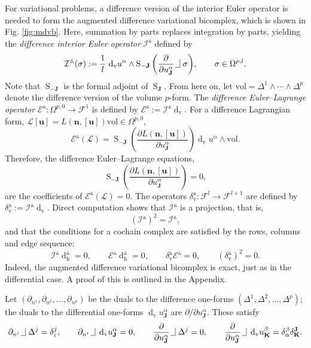 \documentclass[11pt]{article} %
\numberwithin{equation}{section}
\newcommand{\intpsym}{\,\, \setlength{\unitlength}{0.4mm}
	\begin{picture}(0, 0)(5, 5)%
	\put(0, 4){\line(1,0){5}} \put(5,4){\line(0,1){8}}
	\end{picture}\,\,}
\newcommand{\intp}{\,\,\intpsym}
\newcommand{\es}{\operatorname{S}}
\newcommand{\upd}{\operatorname{d}}
\newcommand{\uph}{\operatorname{h}}
\newcommand{\upv}{\operatorname{v}}
\newcommand{\p}{\partial}
\newcommand{\dv}{\upd_{\upv}\!}
\newcommand{\mbn}{\mathbf{n}}
\newcommand{\mbu}{\mathbf{u}}
\newcommand{\mbJ}{\mathbf{J}}
\newcommand{\mbK}{\mathbf{K}}
\newcommand{\mcE}{\mathcal{E}}
\newcommand{\mcI}{\mathcal{I}}
\newcommand{\msL}{\mathscr{L}}
\theoremstyle{plain}
\theoremstyle{definition}
\begin{document}
For variational problems, a difference version of the interior Euler operator is needed to form the augmented difference variational bicomplex, which is shown in Fig. \ref{fig:mdvb}. Here, summation by parts replaces integration by parts, yielding the \textit{difference interior Euler operator} $\mcI^{\vartriangle}$ defined by
\begin{equation} %
\mcI^{\vartriangle}(\sigma):=\frac{1}{l}\,\dv u^{\alpha}
\wedge{\es_{-\mbJ}\left(\frac{\partial}{\partial
		u^{\alpha}_{\mbJ}}\intp\sigma\right)}, \qquad
\sigma\in\Omega^{p,l}.
\end{equation}
Note that $\es_{-\mbJ}$ is the formal adjoint of $\es_{\mbJ}$. From here on, let $\text{vol}=\Delta^1\wedge\cdots\wedge\Delta^p$ denote the difference version of the volume $p$-form. The \textit{difference Euler--Lagrange operator} $\mcE^{\vartriangle}:\Omega^{p,0}\rightarrow\mathscr{F}^1$ is defined by $\mcE^{\vartriangle}:=\mcI^{\vartriangle}\dv $. For a difference Lagrangian form, $\msL[\mbu]=L(\mbn,[\mbu])\text{vol}\in\Omega^{p,0}$,
\begin{equation}
\mcE^{\vartriangle}(\msL)=\es_{-\mbJ}\left(\frac{\partial L(\mbn,[\mbu])}{\partial u^{\alpha}_{\mbJ}}\right)\dv u^\alpha\wedge \text{vol}.
\end{equation}
Therefore, the difference Euler--Lagrange equations,
\[
\es_{-\mbJ}\left(\frac{\partial L(\mbn,[\mbu])}{\partial u^{\alpha}_{\mbJ}}\right)=0,
\]
are the coefficients of $\mcE^{\vartriangle}(\msL)=0$.
The operators
$\delta_{\upv}^{\vartriangle}:\mathscr{F}^l\rightarrow\mathscr{F}^{l+1}$ are
defined by
$\delta_{\upv}^{\vartriangle}:=\mcI^{\vartriangle}\dv $. Direct computation shows that $\mcI^{\vartriangle}$ is a projection, that is,
\begin{equation}\label{iproj}
\left(\mcI^{\vartriangle}\right)^2=\mcI^{\vartriangle},
\end{equation} and that the conditions for a cochain complex are satisfied by the rows, columns and edge sequence:
\begin{equation}\label{coch}
\mcI^{\vartriangle}\upd_{\uph}^{\vartriangle}=0,\qquad \mcE^{\vartriangle}\upd_{\uph}^{\vartriangle}=0,\qquad \delta_{\upv}^{\vartriangle}\mcE^{\vartriangle}=0,\qquad \left(\delta_{\upv}^{\vartriangle}\right)^2=0.
\end{equation}
Indeed, the augmented difference variational bicomplex is exact, just as in the differential case. A proof of this is outlined in the Appendix. 


Let $(\p_{n^1},\p_{n^2},\ldots,\p_{n^p})$ be the duals to the difference one-forms $(\Delta^1,\Delta^2,\ldots,\Delta^p)$; the duals to the differential one-forms $\dv u^\alpha_{\mbJ}$ are $\p/\p{u^{\alpha}_{\mbJ}}$. These satisfy
\begin{equation}
\p_{n^i}\intp\Delta^j=\delta_i^j,\qquad
\p_{n^i}\intp\dv 
u^{\alpha}_{\mbJ}=0,\qquad
\frac{\partial}{\partial u^{\alpha}_{\mbJ}}\intp \Delta^j=0,\qquad \frac{\partial}{\partial u^{\alpha}_{\mbJ}}\intp \dv u^\beta_\mbK=\delta^\beta_\alpha\delta^\mbJ_\mbK.
\end{equation}
\end{document}
